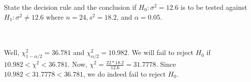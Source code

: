 State the decision rule and the conclusion if $H_0:\sigma^2=12.6$ is to be tested against
$H_1:\sigma^2\neq12.6$ where $n=24, s^2=18.2$, and $\alpha=0.05$.\\\\

\begin{solution}\renewcommand{\qedsymbol}{}\ \\
    Well, $\chi^2_{1-\alpha/2}=36.781$ and $\chi^2_{\alpha/2}=10.982$. We will fail to reject $H_0$ if
    $10.982<\chi^2<36.781$. Now, $\chi^2=\frac{22*18.2}{12.6}=31.7778$. Since $10.982<31.7778<36.781$,
    we do indeed fail to reject $H_0$.

\end{solution}
